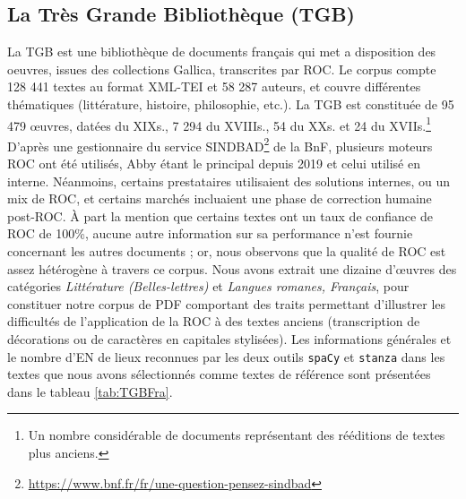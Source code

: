 \subsection{La Très Grande Bibliothèque (TGB)}
La TGB est une bibliothèque de documents français qui met a disposition des oeuvres, issues des collections Gallica, transcrites par ROC. Le corpus compte 128 441 textes au format XML-TEI et 58 287 auteurs, et couvre différentes thématiques (littérature, histoire, philosophie, etc.). La TGB est constituée de 95 479 œuvres, datées du XIX\ieme{}s., 7 294 du XVIII\ieme{}s., 54 du XX\ieme{}s. et 24 du XVII\ieme{}s.\footnote{Un nombre considérable de documents représentant des rééditions de textes plus anciens.} 
D'après une gestionnaire du service SINDBAD\footnote{\url{https://www.bnf.fr/fr/une-question-pensez-sindbad}} de la BnF, plusieurs moteurs ROC ont été utilisés, Abby étant le principal depuis 2019 et celui utilisé en interne. Néanmoins, certains prestataires utilisaient des solutions internes, ou un mix de ROC, et certains marchés incluaient une phase de correction humaine post-ROC. À part la mention que certains textes ont un taux de confiance de ROC de 100\%, aucune autre information sur sa performance n'est fournie concernant les autres documents ; or, nous observons que la qualité de ROC est assez hétérogène à travers ce corpus. Nous avons extrait une dizaine d'œuvres des catégories \textit{Littérature (Belles-lettres)} et \textit{Langues romanes, Français}, pour constituer notre corpus de PDF comportant des traits permettant d'illustrer les difficultés de l'application de la ROC à des textes anciens (transcription de décorations ou de caractères en capitales stylisées). Les informations générales et le nombre d'EN de lieux reconnues par les deux outils \texttt{spaCy} et \texttt{stanza} dans les textes que nous avons sélectionnés comme textes de référence sont présentées dans le tableau \ref{tab:TGBFra}.
